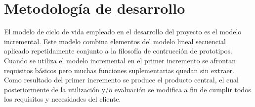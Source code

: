 


\section{Metodología de desarrollo}
El modelo de ciclo de vida empleado en el desarrollo del proyecto es el modelo incremental. Este modelo combina elementos del modelo lineal secuencial aplicado repetidamente conjunto a la filosofía de contrucción de prototipos.\\
Cuando se utiliza el modelo incremental en el primer incremento se afrontan requisitos básicos pero muchas funciones suplementarias quedan sin extraer. Como resultado del primer incremento se produce el producto central, el cual posteriormente de la utilización y/o evaluación se modifica a fin de cumplir todos los requisitos y necesidades del cliente.\\


